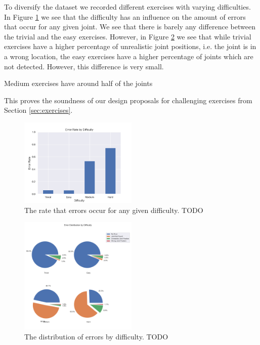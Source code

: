 To diversify the dataset we recorded different exercises with varying difficulties. In Figure \ref{fig:statistics_err_diff} we see that the difficulty has an influence on the amount of errors that occur for any given joint. We see that there is barely any difference between the trivial and the easy exercises. However, in Figure \ref{fig:statistics_err_dist_diff} we see that while trivial exercises have a higher percentage of unrealistic joint positions, i.e. the joint is in a wrong location, the easy exercises have a higher percentage of joints which are not detected. However, this difference is very small. 

Medium exercises have around half of the joints

This proves the soundness of our design proposals for challenging exercises from Section \ref{sec:exercises}.

\begin{figure}
  \centering
  \includegraphics[width=0.5\textwidth]{figures/Data/Error_Rate_by_Difficulty.png}
  \caption[Error Rate by Difficulty]{The rate that errors occur for any given difficulty. TODO}
  \label{fig:statistics_err_diff}
\end{figure}

\begin{figure}
  \centering
  \includegraphics[width=0.5\textwidth]{figures/Data/Error_Distribution_by_Difficulty.png}
  \caption[Error Distribution by Difficulty]{The distribution of errors by difficulty. TODO}
  \label{fig:statistics_err_dist_diff}
\end{figure}

